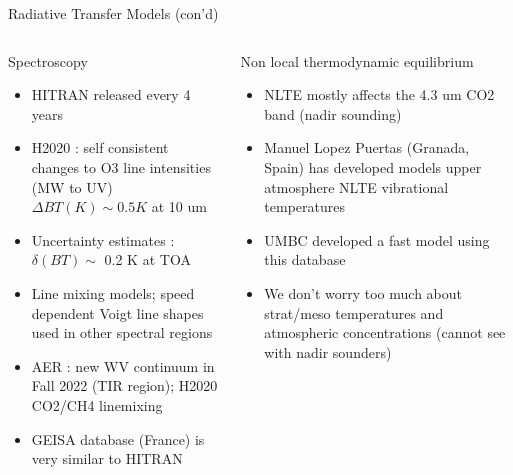\documentclass[10pt,t]{beamer}
\begin{document}
\begin{frame}[shrink=2]{Radiative Transfer Models (con'd)}
\vspace{-0.1in}
\begin{columns}

\begin{column}{0.55\columnwidth}
\begin{block}{Spectroscopy}
  \begin{itemize}
  \item HITRAN released every 4 years
  \item H2020 : self consistent changes to O3 line intensities (MW to UV) $\Delta BT(K) \sim 0.5K$ at 10 um
  \item Uncertainty estimates : $\delta(BT) \sim$ 0.2 K at TOA  
  \item Line mixing models; speed dependent Voigt line shapes used in other spectral regions
  \item AER : new WV continuum in Fall 2022 (TIR region); H2020 CO2/CH4 linemixing
  \item GEISA database (France) is very similar to HITRAN

  \end{itemize}
\end{block}
\end{column}

\begin{column}{0.55\columnwidth}
\begin{block}{Non local thermodynamic equilibrium}
  \begin{itemize}
  \item NLTE mostly affects the 4.3 um CO2 band (nadir sounding)
  \item Manuel Lopez Puertas (Granada, Spain) has developed models upper atmosphere NLTE vibrational temperatures
  \item UMBC developed a fast model using this database
  \item We don't worry too much about strat/meso temperatures and atmospheric concentrations (cannot see with nadir sounders)
  \end{itemize}
\end{block}
\end{column}
\end{columns}
\end{frame}
\end{document}
